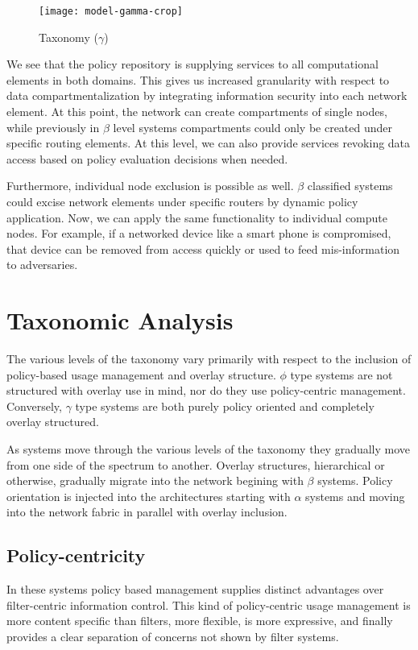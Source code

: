 \begin{figure}[!t]
\centering
\texttt{[image: model-gamma-crop]}
\caption{Taxonomy ($\gamma$)}
\label{fig:model:taxonomy-gamma}
\end{figure}

We see that the policy repository is supplying services to all computational elements in both domains.  This gives us increased granularity with respect to data compartmentalization by integrating information security into each network element.  At this point, the network can create compartments of single nodes, while previously in $\beta$ level systems compartments could only be created under specific routing elements.  At this level, we can also provide services revoking data access based on policy evaluation decisions when needed.

Furthermore, individual node exclusion is possible as well. $\beta$ classified systems could excise network elements under specific routers by dynamic policy application.  Now, we can apply the same functionality to individual compute nodes.  For example, if a networked device like a smart phone is compromised, that device can be removed from access quickly or used to feed mis-information to adversaries.

\section{Taxonomic Analysis}
The various levels of the taxonomy vary primarily with respect to the inclusion of policy-based usage management and overlay structure.  $\phi$ type systems are not structured with overlay use in mind, nor do they use policy-centric management.  Conversely, $\gamma$ type systems are both purely policy oriented and completely overlay structured.

As systems move through the various levels of the taxonomy they gradually move from one side of the spectrum to another.  Overlay structures, hierarchical or otherwise, gradually migrate into the network begining with $\beta$ systems.  Policy orientation is injected into the architectures starting with $\alpha$ systems and moving into the network fabric in parallel with overlay inclusion.

\subsection{Policy-centricity}
In these systems policy based management supplies distinct advantages over filter-centric information control.  This kind of policy-centric usage management is more content specific than filters, more flexible, is more expressive, and finally provides a clear separation of concerns not shown by filter systems.

